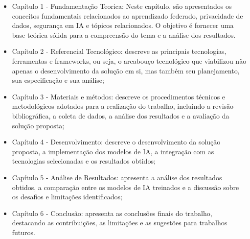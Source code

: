 \begin{itemize}
    \item Capítulo 1 - Fundamentação Teorica: Neste capítulo, são apresentados os conceitos fundamentais relacionados ao aprendizado federado, privacidade de dados, segurança em IA e tópicos relacionados. O objetivo é fornecer uma base teórica sólida para a compreensão do tema e a análise dos resultados.
    \item Capítulo 2 - Referencial Tecnológico: descreve as principais tecnologias, ferramentas e frameworks, ou seja, o arcabouço tecnológico que viabilizou não apenas o desenvolvimento da solução em si, mas também seu planejamento, sua especificação e sua análise;
    \item Capítulo 3 - Materiais e métodos: descreve os procedimentos técnicos e metodológicos adotados para a realização do trabalho, incluindo a revisão bibliográfica, a coleta de dados, a análise dos resultados e a avaliação da solução proposta;
    \item Capítulo 4 - Desenvolvimento: descreve o desenvolvimento da solução proposta, a implementação dos modelos de IA, a integração com as tecnologias selecionadas e os resultados obtidos;
    \item Capítulo 5 - Análise de Resultados: apresenta a análise dos resultados obtidos, a comparação entre os modelos de IA treinados e a discussão sobre os desafios e limitações identificados;
    \item Capítulo 6 - Conclusão: apresenta as conclusões finais do trabalho, destacando as contribuições, as limitações e as sugestões para trabalhos futuros.
\end{itemize}